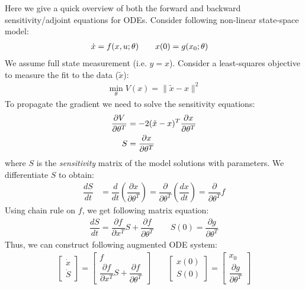 \documentclass[fontsize=11pt]{article}
\newcommand{\norm}[1]{\lVert #1 \rVert}
\theoremstyle{definition}
\begin{document}
Here we give a quick overview of both the forward and backward sensitivity/adjoint 
equations for ODEs. Consider following non-linear state-space model:
\begin{align}
    \dot{x} &= f(x, u; \theta) \qquad x(0) = g(x_0; \theta)\notag 
    \label{eq:ssode}
\end{align}
We assume full state measurement (i.e. $y=x$). Consider a least-squares objective
to measure the fit to the data ($\tilde{x}$):
\begin{align}
    \min\limits_{\theta} V(x) = \norm{\tilde{x} - x}^2 
\end{align}
To propagate the gradient we need to solve the sensitivity equations:
\begin{align}
    \dfrac{\partial V}{\partial \theta^T} &= -2 (\tilde{x} - x)^T \dfrac{\partial x}{\partial \theta^T} \notag \\ 
    S &= \dfrac{\partial x}{\partial \theta^T}
    \label{eq:sens}
\end{align}
where $S$ is the \textit{sensitivity} matrix of the model solutions with parameters. We differentiate $S$ to obtain:
\begin{align}
    \dfrac{d S}{dt} &= \dfrac{d}{dt} \left(\dfrac{\partial x}{\partial \theta^T}\right) =
    \dfrac{\partial}{\partial\theta^T} \left(\dfrac{d x}{dt}\right) = 
    \dfrac{\partial }{\partial \theta^T} f
\end{align}
Using chain rule on $f$, we get following matrix equation:
\begin{align}
    \dfrac{dS}{dt} = \dfrac{\partial f}{\partial x^T}S + \dfrac{\partial f}{\partial \theta^T} \qquad  S(0) = \dfrac{\partial g}{\partial \theta^T}
\end{align}
Thus, we can construct following augmented ODE system:
\begin{align}
    \begin{bmatrix} \dot{x} \\ \dot{S} \end{bmatrix} = 
    \begin{bmatrix} f \\ \dfrac{\partial f}{\partial x^T}S + \dfrac{\partial f}{\partial \theta^T} \end{bmatrix}
    \qquad
    \begin{bmatrix} x(0) \\ S(0) \end{bmatrix} =
    \begin{bmatrix} x_0 \\ \dfrac{\partial g}{\partial \theta^T} \end{bmatrix}
    \label{eq:augsensode}
\end{align}
\end{document}
